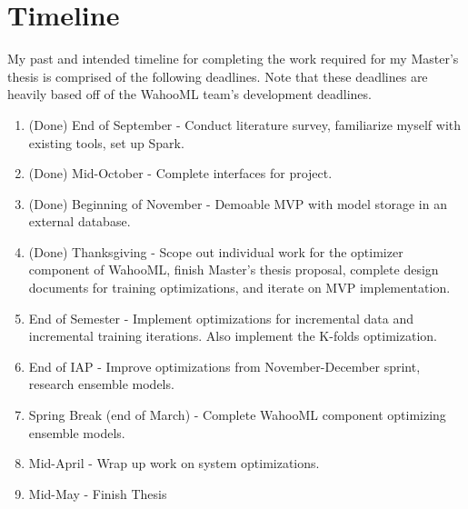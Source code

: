 \documentclass[../proposal.tex]{subfiles}
\begin{document}
\section{Timeline}

My past and intended timeline for completing the work required for my Master's
thesis is comprised of the following deadlines. Note that these deadlines are
heavily based off of the WahooML team's development deadlines. 

\begin{enumerate}[topsep=0pt,itemsep=-1ex,partopsep=1ex,parsep=1ex]

\item (Done) End of September - Conduct literature survey, familiarize myself
with existing tools, set up Spark.

\item (Done) Mid-October - Complete interfaces for project.

\item (Done) Beginning of November - Demoable MVP with model storage in an
external database.

\item (Done) Thanksgiving - Scope out individual work for the optimizer component of
WahooML, finish Master's thesis proposal, complete design documents for
training optimizations, and iterate on MVP implementation.

\item End of Semester - Implement optimizations for incremental data and
incremental training iterations. Also implement the K-folds optimization.

\item End of IAP - Improve optimizations from November-December sprint,
research ensemble models.

\item Spring Break (end of March) - Complete WahooML component optimizing
ensemble models.

\item Mid-April - Wrap up work on system optimizations.

\item Mid-May - Finish Thesis

\end{enumerate}
\end{document}
